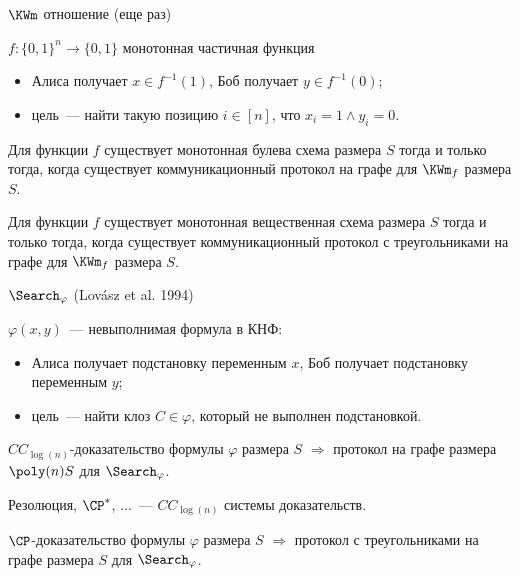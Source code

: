 \begin{frame}{$\KWm$ отношение (еще раз)}

    $f:\{0, 1\}^n \to \{0, 1\}$ монотонная частичная функция
    
    \begin{itemize}
        \item Алиса получает $x \in f^{-1}(1)$, Боб получает $y \in f^{-1}(0)$;
        \item цель~--- найти такую позицию $i \in [n]$, что $x_i = 1 \land y_i = 0$.
    \end{itemize}

    \pause

    \begin{theorem}
        Для функции $f$ существует монотонная булева \alert{схема} размера $S$ тогда и только тогда, когда
        существует коммуникационный протокол \alert{на графе} для $\KWm_f$ размера $S$.
    \end{theorem}

    \pause

    \begin{theorem}
        Для функции $f$ существует монотонная вещественная схема размера $S$ тогда и только тогда, когда
        существует коммуникационный протокол с треугольниками на графе для $\KWm_f$ размера $S$.
    \end{theorem}
\end{frame}


\begin{frame}{$\Search_{\varphi}$ (Lov{\'{a}}sz et al. 1994)}
    
    $\varphi(x, y)$~--- невыполнимая формула в КНФ:
    \begin{itemize}
        \item Алиса получает подстановку переменным $x$, Боб получает подстановку переменным $y$;
        \item цель~--- найти клоз $C \in \varphi$, который не выполнен подстановкой.
    \end{itemize}

    \pause

    \begin{theorem}[Kraj{\'{\i}}{\v{c}}ek 95; С 17]
        $CC_{\log(n)}$-доказательство формулы $\varphi$ размера $S$ $\Rightarrow$ протокол на графе
        размера $\poly(n) S$ для $\Search_{\varphi}$.
    \end{theorem}

    Резолюция, $\CP^*$, $\dots$~--- $CC_{\log(n)}$ системы доказательств.

    \pause
    
    \begin{theorem}[S 17]
        $\CP$-доказательство формулы $\varphi$ размера $S$ $\Rightarrow$ протокол с треугольниками на
        графе размера $S$ для $\Search_{\varphi}$.
    \end{theorem}
\end{frame}